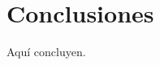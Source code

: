 \documentclass{ci5652}
\begin{document}

\section*{Conclusiones}


Aquí concluyen.


\small

\end{document}
